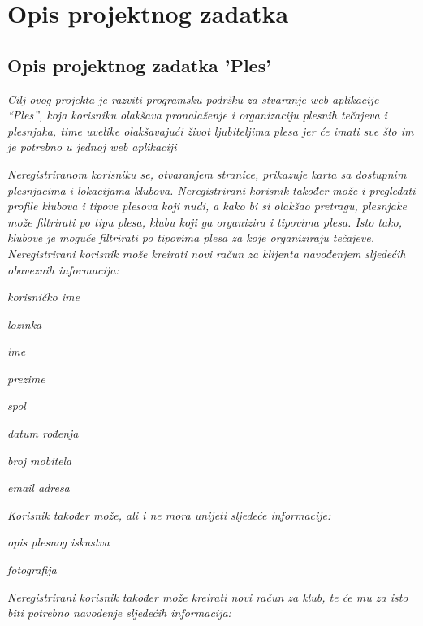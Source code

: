 \chapter{Opis projektnog zadatka}
\usepackage{graphicx}
\section{Opis projektnog zadatka 'Ples'}

\textit{Cilj ovog projekta je razviti programsku podršku za stvaranje web aplikacije “Ples”, koja korisniku olakšava pronalaženje i organizaciju plesnih tečajeva i plesnjaka, time uvelike olakšavajući život ljubiteljima plesa jer će imati sve što im je potrebno u jednoj web aplikaciji}

\textit{Neregistriranom korisniku se, otvaranjem stranice, prikazuje karta sa dostupnim plesnjacima i lokacijama klubova. Neregistrirani korisnik također može i pregledati profile klubova i tipove plesova koji nudi, a kako bi si olakšao pretragu, plesnjake može filtrirati po tipu plesa, klubu koji ga organizira i tipovima plesa. Isto tako, klubove je moguće filtrirati po tipovima plesa za koje organiziraju tečajeve. 
	Neregistrirani korisnik može kreirati novi račun za klijenta navođenjem sljedećih obaveznih informacija:
}
\begin{packed_item}
	\item \textit{korisničko ime}
	\item \textit{lozinka}
	\item \textit{ime}
	\item \textit{prezime}
	\item \textit{spol}
	\item \textit{datum rođenja}
	\item \textit{broj mobitela}
	\item \textit{email adresa}
\end{packed_item}

\textit{Korisnik također može, ali i ne mora unijeti sljedeće informacije:}

\begin{packed_item}
	\item \textit{opis plesnog iskustva}
	\item \textit{fotografija}
\end{packed_item}

\textit{Neregistrirani korisnik također može kreirati novi račun za klub, te će mu za isto biti potrebno navođenje sljedećih informacija:}

